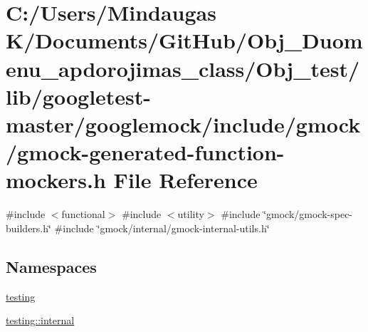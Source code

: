 \hypertarget{_obj__test_2lib_2googletest-master_2googlemock_2include_2gmock_2gmock-generated-function-mockers_8h}{}\section{C\+:/\+Users/\+Mindaugas K/\+Documents/\+Git\+Hub/\+Obj\+\_\+\+Duomenu\+\_\+apdorojimas\+\_\+class/\+Obj\+\_\+test/lib/googletest-\/master/googlemock/include/gmock/gmock-\/generated-\/function-\/mockers.h File Reference}
\label{_obj__test_2lib_2googletest-master_2googlemock_2include_2gmock_2gmock-generated-function-mockers_8h}
{\ttfamily \#include $<$functional$>$}\newline
{\ttfamily \#include $<$utility$>$}\newline
{\ttfamily \#include \char`\"{}gmock/gmock-\/spec-\/builders.\+h\char`\"{}}\newline
{\ttfamily \#include \char`\"{}gmock/internal/gmock-\/internal-\/utils.\+h\char`\"{}}\newline
\subsection*{Namespaces}
\begin{DoxyCompactItemize}
\item 
 \mbox{\hyperlink{namespacetesting}{testing}}
\item 
 \mbox{\hyperlink{namespacetesting_1_1internal}{testing\+::internal}}
\end{DoxyCompactItemize}
